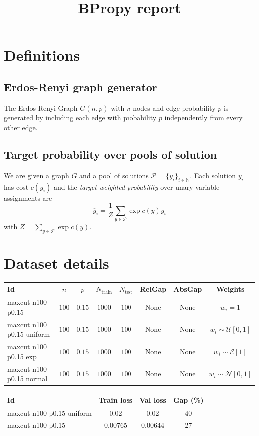 \documentclass[a4paper]{report}
\title{BPropy report}
\begin{document}
\tableofcontents

\section{Definitions}

\subsection{Erdos-Renyi graph generator}
The Erdos-Renyi Graph $G(n,p)$ with $n$ nodes and edge probability $p$ is generated by including each edge with probability $p$ independently from every other edge.

\subsection{Target probability over pools of solution}
We are given a graph $G$ and a pool of solutions $\mathcal{P} = \{ y_i \}_{i\in\mathbb{N}}$. Each solution $y_i$ has cost $c(y_i)$ and the \emph{target weighted probability} over unary variable assignments are $$\overline{y}_i = \frac{1}{Z}\sum\limits_{y\in\mathcal{P}} \exp c(y) y_i$$ 
with $Z = \sum\limits_{y\in\mathcal{P}} \exp c(y)$. 



\section{Dataset details}


\begin{center}
\begin{tabular}{lccccccc}
\hline
	Id & $n$ & $p$ & $N_{\text{train}}$ & $N_{\text{test}}$ & RelGap & AbsGap & Weights\\
	\hline
	maxcut n100 p0.15         & $100$ & $0.15$ & $1000$ & $100$ & None & None & $w_i=1$\\
	maxcut n100 p0.15 uniform & $100$ & $0.15$ & $1000$ & $100$ & None & None & $w_i \sim \mathcal{U}[0,1]$ \\
	maxcut n100 p0.15 exp & $100$ & $0.15$ & $1000$ & $100$ & None & None & $w_i \sim \mathcal{E}[1]$ \\
	maxcut n100 p0.15 normal & $100$ & $0.15$ & $1000$ & $100$ & None & None & $w_i \sim \mathcal{N}[0,1]$


\end{tabular}
\end{center}

\begin{center}
\begin{tabular}{lccc}
\hline
	Id & Train loss & Val loss & Gap (\%) \\
	\hline
	maxcut n100 p0.15 uniform & 0.02 & 0.02 &  40 \\
	maxcut n100 p0.15 &0.00765 & 0.00644 & 27 \\
\end{tabular}
\end{center}
\end{document}
